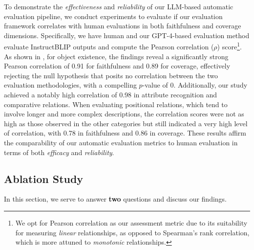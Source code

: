 To demonstrate the \textit{effectiveness} and \textit{reliability} of our LLM-based automatic evaluation pipeline, we conduct experiments to evaluate if our evaluation framework correlates with human evaluations in both faithfulness and coverage dimensions. Specifically, we have human and our GPT-4-based evaluation method evaluate InstructBLIP outputs and compute the Pearson correlation ($\rho$) score\footnote{We opt for Pearson correlation as our assessment metric due to its suitability for measuring \textit{linear} relationships, as opposed to Spearman's rank correlation, which is more attuned to \textit{monotonic} relationships.}. As shown in , for object existence, the findings reveal a significantly strong Pearson correlation of 0.91 for faithfulness and 0.89 for coverage, effectively rejecting the null hypothesis that posits no correlation between the two evaluation methodologies, with a compelling $p$-value of 0. Additionally, our study achieved a notably high correlation of 0.98 in attribute recognition and comparative relations. When evaluating positional relations, which tend to involve longer and more complex descriptions, the correlation scores were not as high as those observed in the other categories but still indicated a very high level of correlation, with 0.78 in faithfulness and 0.86 in coverage. These results affirm the comparability of our automatic evaluation metrics to human evaluation in terms of both \textit{efficacy} and \textit{reliability}.

\subsection{Ablation Study}
\label{subsec:exp_ablation}

In this section, we serve to answer \textbf{two} questions and discuss our findings. 

